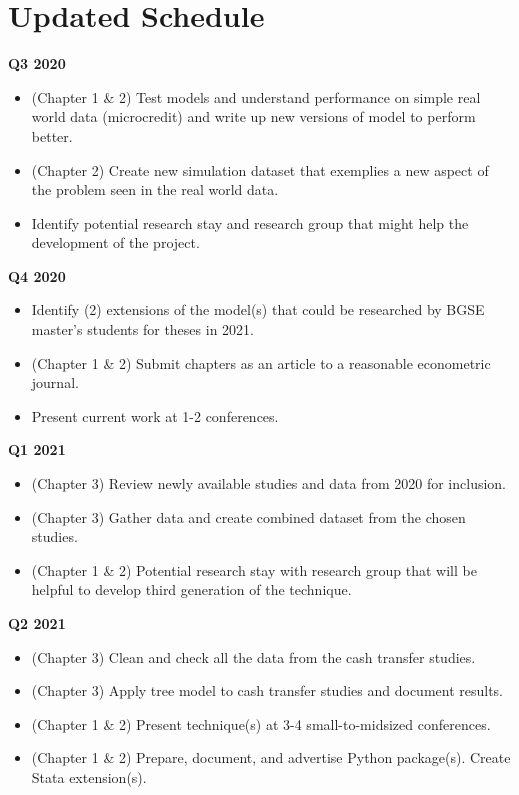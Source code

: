 \documentclass[a4paper,12pt]{article}
\begin{document}
\section { Updated Schedule }


\textbf{Q3 2020}

\begin{itemize}
\item (Chapter 1 \& 2) Test models and understand performance on simple real world data (microcredit) and write up new versions of model to perform better.
\item (Chapter 2) Create new simulation dataset that exemplies a new aspect of the problem seen in the real world data.
\item Identify potential research stay and research group that might help the development of the project.
\end{itemize}


\textbf{Q4 2020}

\begin{itemize}
\item Identify (2) extensions of the model(s) that could be researched by BGSE master’s students for theses in 2021.
\item (Chapter 1 \& 2) Submit chapters as an article to a reasonable econometric journal.
\item Present current work at 1-2 conferences.
\end{itemize}

\textbf{Q1 2021}

\begin{itemize}
\item (Chapter 3) Review newly available studies and data from 2020 for inclusion.
\item (Chapter 3) Gather data and create combined dataset from the chosen studies.
\item (Chapter 1 \& 2) Potential research stay with research group that will be helpful to develop third generation of the technique.
\end{itemize}

\textbf{Q2 2021}

\begin{itemize}
\item (Chapter 3) Clean and check all the data from the cash transfer studies.
\item (Chapter 3) Apply tree model to cash transfer studies and document results.
\item (Chapter 1 \& 2) Present technique(s) at 3-4 small-to-midsized conferences.
\item (Chapter 1 \& 2) Prepare, document, and advertise Python package(s). Create Stata extension(s).
\end{itemize}
\end{document}

